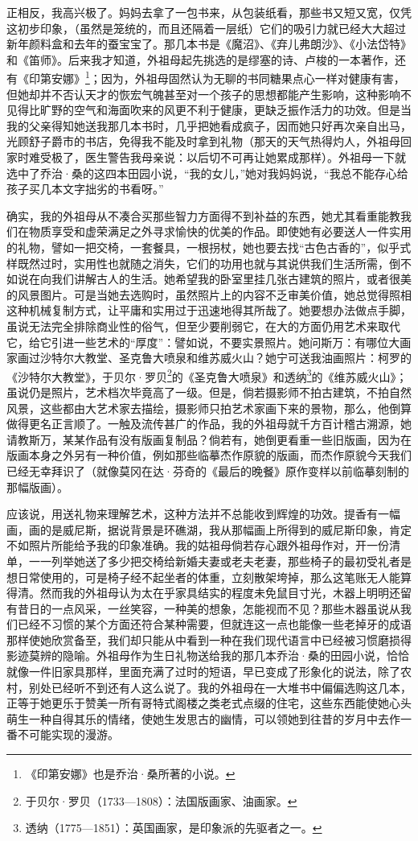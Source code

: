 \par 正相反，我高兴极了。妈妈去拿了一包书来，从包装纸看，那些书又短又宽，仅凭这初步印象，（虽然是笼统的，而且还隔着一层纸）它们的吸引力就已经大大超过新年颜料盒和去年的蚕宝宝了。那几本书是《魔沼》、《弃儿弗朗沙》、《小法岱特》和《笛师》。后来我才知道，外祖母起先挑选的是缪塞的诗、卢梭的一本著作，还有《印第安娜》\footnote{《印第安娜》也是乔治·桑所著的小说。}；因为，外祖母固然认为无聊的书同糖果点心一样对健康有害，但她却并不否认天才的恢宏气魄甚至对一个孩子的思想都能产生影响，这种影响不见得比旷野的空气和海面吹来的风更不利于健康，更缺乏振作活力的功效。但是当我的父亲得知她送我那几本书时，几乎把她看成疯子，因而她只好再次亲自出马，光顾舒子爵市的书店，免得我不能及时拿到礼物（那天的天气热得灼人，外祖母回家时难受极了，医生警告我母亲说：以后切不可再让她累成那样）。外祖母一下就选中了乔治·桑的这四本田园小说，“我的女儿，”她对我妈妈说，“我总不能存心给孩子买几本文字拙劣的书看呀。”
\par 确实，我的外祖母从不凑合买那些智力方面得不到补益的东西，她尤其看重能教我们在物质享受和虚荣满足之外寻求愉快的优美的作品。即使她有必要送人一件实用的礼物，譬如一把交椅，一套餐具，一根拐杖，她也要去找“古色古香的”，似乎式样既然过时，实用性也就随之消失，它们的功用也就与其说供我们生活所需，倒不如说在向我们讲解古人的生活。她希望我的卧室里挂几张古建筑的照片，或者很美的风景图片。可是当她去选购时，虽然照片上的内容不乏审美价值，她总觉得照相这种机械复制方式，让平庸和实用过于迅速地得其所哉了。她要想办法做点手脚，虽说无法完全排除商业性的俗气，但至少要削弱它，在大的方面仍用艺术来取代它，给它引进一些艺术的“厚度”：譬如说，不要实景照片。她问斯万：有哪位大画家画过沙特尔大教堂、圣克鲁大喷泉和维苏威火山？她宁可送我油画照片：柯罗的《沙特尔大教堂》，于贝尔·罗贝\footnote{于贝尔·罗贝（1733—1808）：法国版画家、油画家。}的《圣克鲁大喷泉》和透纳\footnote{透纳（1775—1851）：英国画家，是印象派的先驱者之一。}的《维苏威火山》；虽说仍是照片，艺术档次毕竟高了一级。但是，倘若摄影师不拍古建筑，不拍自然风景，这些都由大艺术家去描绘，摄影师只拍艺术家画下来的景物，那么，他倒算做得更名正言顺了。一触及流传甚广的作品，我的外祖母就千方百计稽古溯源，她请教斯万，某某作品有没有版画复制品？倘若有，她倒更看重一些旧版画，因为在版画本身之外另有一种价值，例如那些临摹杰作原貌的版画，而杰作原貌今天我们已经无幸拜识了（就像莫冈在达·芬奇的《最后的晚餐》原作变样以前临摹刻制的那幅版画）。
\par 应该说，用送礼物来理解艺术，这种方法并不总能收到辉煌的功效。提香有一幅画，画的是威尼斯，据说背景是环礁湖，我从那幅画上所得到的威尼斯印象，肯定不如照片所能给予我的印象准确。我的姑祖母倘若存心跟外祖母作对，开一份清单，一一列举她送了多少把交椅给新婚夫妻或老夫老妻，那些椅子的最初受礼者是想日常使用的，可是椅子经不起坐者的体重，立刻散架垮掉，那么这笔账无人能算得清。然而我的外祖母认为太在乎家具结实的程度未免鼠目寸光，木器上明明还留有昔日的一点风采，一丝笑容，一种美的想象，怎能视而不见？那些木器虽说从我们已经不习惯的某个方面还符合某种需要，但就连这一点也能像一些老掉牙的成语那样使她欣赏备至，我们却只能从中看到一种在我们现代语言中已经被习惯磨损得影迹莫辨的隐喻。外祖母作为生日礼物送给我的那几本乔治·桑的田园小说，恰恰就像一件旧家具那样，里面充满了过时的短语，早已变成了形象化的说法，除了农村，别处已经听不到还有人这么说了。我的外祖母在一大堆书中偏偏选购这几本，正等于她更乐于赞美一所有哥特式阁楼之类老式点缀的住宅，这些东西能使她心头萌生一种自得其乐的情绪，使她生发思古的幽情，可以领她到往昔的岁月中去作一番不可能实现的漫游。
